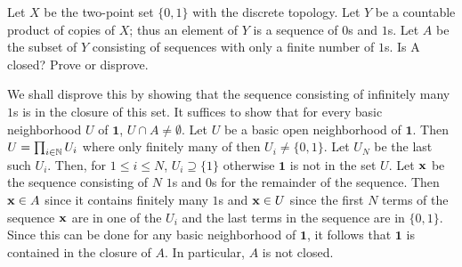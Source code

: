 \begin{problem}
  Let \(X\) be the two-point set \(\{0,1\}\) with the discrete
  topology. Let \(Y\) be a countable product of copies of \(X\); thus an
  element of \(Y\) is a sequence of \(0\)s and \(1\)s.  Let \(A\) be the
  subset of \(Y\) consisting of sequences with only a finite number of
  \(1\)s. Is A closed?  Prove or disprove.
\end{problem}
\begin{solution}
  We shall disprove this by showing that the sequence consisting of
  infinitely many \(1\)s is in the closure of this set. It suffices to show
  that for every basic neighborhood \(U\) of \(\mathbf{1}\),
  \(U\cap A\neq\emptyset\). Let \(U\) be a basic open neighborhood of
  \(\mathbf{1}\). Then \(U=\prod_{i\in\mathbb{N}} U_i\) where only finitely many
  of then \(U_i\neq \{0,1\}\). Let \(U_N\) be the last such \(U_i\). Then,
  for \(1\leq i\leq N\), \(U_i\supseteq\{1\}\) otherwise \(\mathbf{1}\) is
  not in the set \(U\). Let \(\mathbf{x}\) be the sequence consisting of \(N\)
  \(1\)s and \(0\)s for the remainder of the sequence. Then \(\mathbf{x}\in A\)
  since it contains finitely many \(1\)s and \(\mathbf{x}\in U\) since the first
  \(N\) terms of the sequence \(\mathbf{x}\) are in one of the \(U_i\) and the
  last terms in the sequence are in \(\{0,1\}\). Since this can be done for
  any basic neighborhood of \(\mathbf{1}\), it follows that \(\mathbf{1}\)
  is contained in the closure of \(A\). In particular, \(A\) is not
  closed.
\end{solution}

